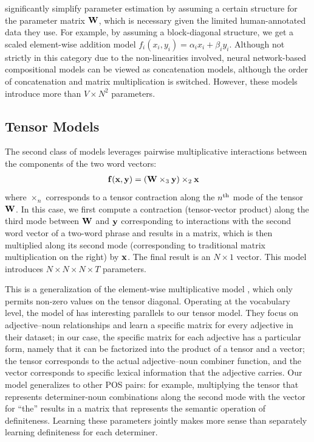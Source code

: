 \documentclass[11pt,letterpaper]{article}
\newcommand{\bX}{{\bf x}}
\newcommand{\bY}{{\bf y}}
\newcommand{\bF}{{\bf f}}
\newcommand{\bW}{{\bf W}}
\begin{document}
 significantly simplify parameter estimation by assuming a certain structure for the parameter matrix $\bW$, which is necessary given the limited human-annotated data they use.   
For example, by assuming a block-diagonal structure, we get a scaled element-wise addition model $f_i (x_i, y_i) = \alpha_i x_i + \beta_i y_i$. 
Although not strictly in this category due to the non-linearities involved, neural network-based compositional models \cite{Socher2012,Hermann2013} can be viewed as concatenation models, although the order of concatenation and matrix multiplication is switched. 
However, these models introduce more than $V \times N^2$ parameters. 

\subsection{Tensor Models}
\label{sec:tensor}

The second class of models leverages pairwise multiplicative interactions between the components of the two word vectors:
\begin{align}
	\bF (\bX, \bY) &= (\bW \times_3 \bY) \times_2 \bX
	\label{eq:tensor}
\end{align}
where $\times_n$ corresponds to a tensor contraction along the $n\textsuperscript{th}$ mode of the tensor $\bW$. 
In this case, we first compute a contraction (tensor-vector product) along the third mode between $\bW$ and $\bY$ corresponding to interactions with the second word vector of a two-word phrase and results in a matrix, which is then multiplied along its second mode (corresponding to traditional matrix multiplication on the right) by $\bX$.  
The final result is an $N \times 1$ vector.  
This model introduces $N \times N \times N \times T$ parameters.  

This is a generalization of the element-wise multiplicative model \cite{Mitchell2008}, which only permits non-zero values on the tensor diagonal.  
Operating at the vocabulary level, the model of  has interesting parallels to our tensor model. 
They focus on adjective--noun relationships and learn a specific matrix for every adjective in their dataset; in our case, the specific matrix for each adjective has a particular form, namely that it can be factorized into the product of a tensor and a vector; the tensor corresponds to the actual adjective--noun combiner function, and the vector corresponds to specific lexical information that the adjective carries. 
Our model generalizes to other POS pairs: for example, multiplying the tensor that represents determiner-noun combinations along the second mode with the vector for ``the'' results in a matrix that represents the semantic operation of definiteness.  
Learning these parameters jointly makes more sense than separately learning definiteness for each determiner.  
\end{document}
